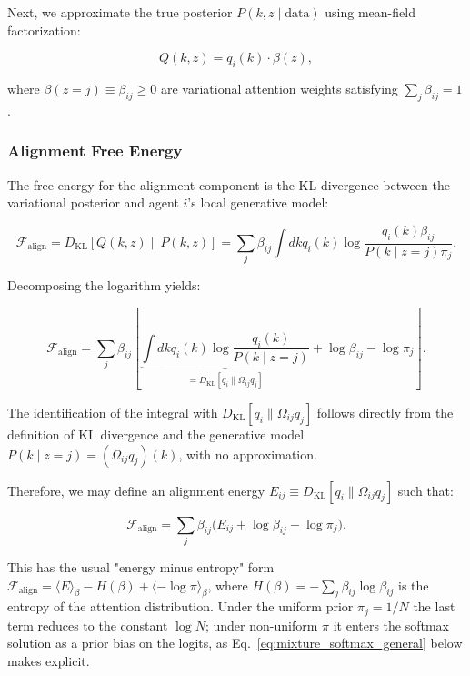 \documentclass[twoside,11pt]{article}
\begin{document}
Next, we approximate the true posterior $P(k, z \mid \text{data})$ using mean-field factorization:

\begin{equation}
Q(k, z) = q_i(k) \cdot \beta(z),
\label{eq:mixture_posterior}
\end{equation}

where $\beta(z = j) \equiv \beta_{ij} \geq 0$ are variational attention weights satisfying $\sum_j \beta_{ij} = 1$.

\subsubsection{Alignment Free Energy}

The free energy for the alignment component is the KL divergence between the variational posterior and agent $i$'s local generative model:

\begin{equation}
\mathcal{F}_{\text{align}} = D_{\mathrm{KL}}[Q(k,z) \| P(k,z)] = \sum_j \beta_{ij} \int dk q_i(k) \log \frac{q_i(k) \beta_{ij}}{P(k \mid z{=}j) \pi_j}.
\end{equation}

Decomposing the logarithm yields:

\begin{equation}
\mathcal{F}_{\text{align}} = \sum_j \beta_{ij} \left[ \underbrace{\int dk q_i(k) \log \frac{q_i(k)}{P(k \mid z{=}j)}}_{= D_{\mathrm{KL}}[q_i \| \Omega_{ij} q_j]} + \log \beta_{ij} - \log \pi_j \right].
\label{eq:mixture_free_energy}
\end{equation}

The identification of the integral with $D_{\mathrm{KL}}[q_i \| \Omega_{ij} q_j]$ follows directly from the definition of KL divergence and the generative model $P(k \mid z{=}j) = (\Omega_{ij} q_j)(k)$, with no approximation.

Therefore, we may define an alignment energy $E_{ij} \equiv D_{\mathrm{KL}}[q_i \| \Omega_{ij} q_j]$ such that:

\begin{equation}
\mathcal{F}_{\text{align}} = \sum_j \beta_{ij} \big( E_{ij} + \log \beta_{ij} - \log \pi_j \big).
\label{eq:mixture_energy_entropy}
\end{equation}

This has the usual "energy minus entropy" form $\mathcal{F}_{\text{align}} = \langle E \rangle_\beta - H(\beta) + \langle -\log \pi \rangle_\beta$, where $H(\beta) = -\sum_j \beta_{ij}\log\beta_{ij}$ is the entropy of the attention distribution. Under the uniform prior $\pi_j = 1/N$ the last term reduces to the constant $\log N$; under non-uniform $\pi$ it enters the softmax solution as a prior bias on the logits, as Eq.~\eqref{eq:mixture_softmax_general} below makes explicit.
\end{document}
